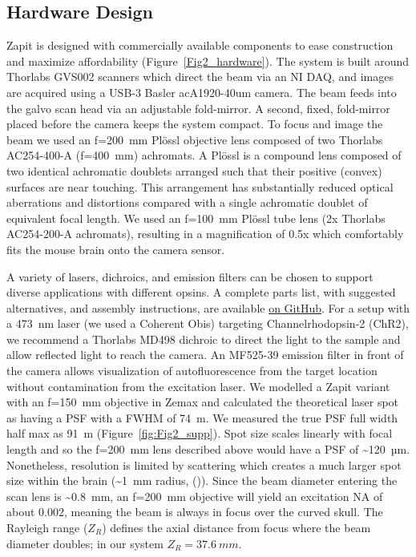 \documentclass[9pt,lineno]{elife}
\begin{document}
\subsection{Hardware Design}
Zapit is designed with commercially available components to ease construction and maximize affordability (Figure~\ref{Fig2_hardware}).
The system is built around Thorlabs GVS002 scanners which direct the beam via an NI DAQ, and images are acquired using a USB-3 Basler acA1920-40um camera.
The beam feeds into the galvo scan head via an adjustable fold-mirror.
A second, fixed, fold-mirror placed before the camera keeps the system compact.
To focus and image the beam we used an f=200~mm Pl\"{o}ssl objective lens composed of two Thorlabs AC254-400-A (f=400~mm) achromats.
A Pl\"{o}ssl is a compound lens composed of two identical achromatic doublets arranged such that their positive (convex) surfaces are near touching.
This arrangement has substantially reduced optical aberrations and distortions compared with a single achromatic doublet of equivalent focal length.
We used an f=100~mm Pl\"{o}ssl tube lens (2x Thorlabs AC254-200-A achromats), resulting in a magnification of 0.5x which comfortably fits the mouse brain onto the camera sensor.

A variety of lasers, dichroics, and emission filters can be chosen to support diverse applications with different opsins.
A complete parts list, with suggested alternatives, and assembly instructions, are available \href{https://github.com/Zapit-Optostim/zapit_CAD/blob/main/Parts_List.md}{on GitHub}.
For a setup with a 473~nm laser (we used a Coherent Obis) targeting Channelrhodopsin-2 (ChR2), we recommend a Thorlabs MD498 dichroic to direct the light to the sample and allow reflected light to reach the camera.
An MF525-39 emission filter in front of the camera allows visualization of autofluorescence from the target location without contamination from the excitation laser.
We modelled a Zapit variant with an f=150~mm objective in Zemax and calculated the theoretical laser spot as having a PSF with a FWHM of 74~\textmu m.
We measured the true PSF full width half max as 91~\textmu m (Figure~\ref{fig:Fig2_supp}).
Spot size scales linearly with focal length and so the f=200~mm lens described above would have a PSF of \textasciitilde{}120~µm.
Nonetheless, resolution is limited by scattering which creates a much larger spot size within the brain (\textasciitilde{}1~mm radius, (\citealp{Li2019SpatiotemporalCircuits})).
Since the beam diameter entering the scan lens is \textasciitilde{}0.8~mm, an f=200~mm objective will yield an excitation NA of about 0.002, meaning the beam is always in focus over the curved skull.
The Rayleigh range ($Z_R$) defines the axial distance from focus where the beam diameter doubles; in our system $Z_R=37.6~mm$.
\end{document}
